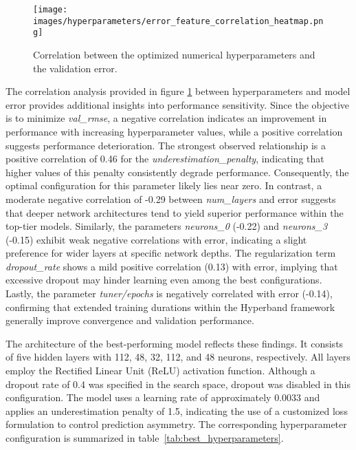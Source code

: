 \begin{figure}[H]
	\centering
	\texttt{[image: images/hyperparameters/error\_feature\_correlation\_heatmap.png]}
	\caption{Correlation between the optimized numerical hyperparameters and the validation error.}
	\label{fig:error_feature_correlation_heatmap}
\end{figure}

The correlation analysis provided in figure \ref{fig:error_feature_correlation_heatmap} between hyperparameters and model error provides additional insights into performance sensitivity. Since the objective is to minimize \textit{val\_rmse}, a negative correlation indicates an improvement in performance with increasing hyperparameter values, while a positive correlation suggests performance deterioration. The strongest observed relationship is a positive correlation of 0.46 for the \textit{underestimation\_penalty}, indicating that higher values of this penalty consistently degrade performance. Consequently, the optimal configuration for this parameter likely lies near zero. In contrast, a moderate negative correlation of -0.29 between \textit{num\_layers} and error suggests that deeper network architectures tend to yield superior performance within the top-tier models. Similarly, the parameters \textit{neurons\_0} (-0.22) and \textit{neurons\_3} (-0.15) exhibit weak negative correlations with error, indicating a slight preference for wider layers at specific network depths. The regularization term \textit{dropout\_rate} shows a mild positive correlation (0.13) with error, implying that excessive dropout may hinder learning even among the best configurations. Lastly, the parameter \textit{tuner/epochs} is negatively correlated with error (-0.14), confirming that extended training durations within the Hyperband framework generally improve convergence and validation performance.

The architecture of the best-performing model reflects these findings. It consists of five hidden layers with 112, 48, 32, 112, and 48 neurons, respectively. All layers employ the Rectified Linear Unit (ReLU) activation function. Although a dropout rate of 0.4 was specified in the search space, dropout was disabled in this configuration. The model uses a learning rate of approximately 0.0033 and applies an underestimation penalty of 1.5, indicating the use of a customized loss formulation to control prediction asymmetry. The corresponding hyperparameter configuration is summarized in table~\ref{tab:best_hyperparameters}.

